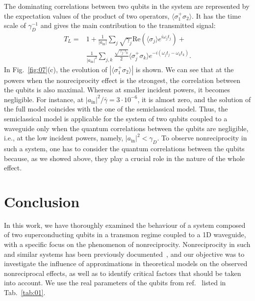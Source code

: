 \documentclass[lettersize,journal]{IEEEtran}
\begin{document}
The dominating correlations between two qubits in the system are represented by the expectation values of the product of two operators, $\langle \sigma_1^+ \sigma_2 \rangle$.
It has the time scale of $\gamma_D^{-1}$ and gives the main contribution to the transmitted signal:
\begin{equation} \label{eq:25}
\begin{aligned}
    T_L =& 1 + \frac{1}{|a_\mathrm{in}|}\sum_j \sqrt{\gamma_j} \mathrm{Re}\left(\langle \sigma_j \rangle e^{i \omega_j t_j}\right) + \\
    &\frac{1}{|a_\mathrm{in}|^2} \sum_{j,k} \frac{\sqrt{\gamma_j \gamma_k}}{2} \langle \sigma_j^+ \sigma_k \rangle e^{-i (\omega_j t_j - \omega_k t_k)}.
\end{aligned}
\end{equation}
In Fig.~\ref{fig:07}(c), the evolution of $|\langle \sigma_1^+ \sigma_2\rangle |$ is shown.
We can see that at the powers when the nonreciprocity effect is the strongest, the correlation between the qubits is also maximal.
Whereas at smaller incident powers, it becomes negligible.
For instance, at $|a_\mathrm{in}|^2 / \bar{\gamma} = 3\cdot 10^{-6}$, it is almost zero, and the solution of the full model coincides with the one of the semiclassical model.
Thus, the semiclassical model is applicable for the system of two qubits coupled to a waveguide only when the quantum correlations between the qubits are negligible, i.e., at the low incident powers, namely, $|a_\mathrm{in}|^2 < \gamma_D$.
To observe nonreciprocity in such a system, one has to consider the quantum correlations between the qubits because, as we showed above, they play a crucial role in the nature of the whole effect.

\section{Conclusion}

In this work, we have thoroughly examined the behaviour of a system composed of two superconducting qubits in a transmon regime coupled to a 1D waveguide, with a specific focus on the phenomenon of nonreciprocity. 
Nonreciprocity in such and similar systems has been previously documented~\cite{dai_rectification_2015, muller_nonreciprocal_2017, rosario_hamann_nonreciprocity_2018, Nefedkin2022, trivedi_fano-qubits_2023}, and our objective was to investigate the influence of approximations in theoretical models on the observed nonreciprocal effects, as well as to identify critical factors that should be taken into account.
We use the real parameters of the qubits from ref.~\cite{rosario_hamann_nonreciprocity_2018} listed in Tab.~\ref{tab:01}.
\end{document}
